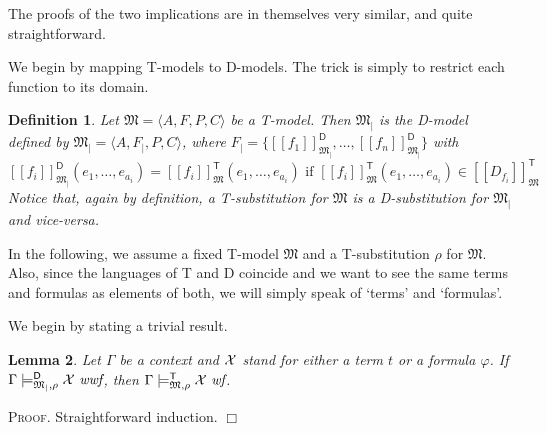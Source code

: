 \documentclass{article}
\newtheorem{definition}{Definition}[section]
\newtheorem{lemma}[definition]{Lemma}
\newenvironment{proof}{\smallskip\textsc{Proof.}}{\hspace*{\fill}$\Box$}
\newcommand{\D}{\textsf D}
\newcommand{\T}{\textsf T}
\newcommand{\restrfunm}[1]{\ensuremath{\mathfrak{#1}_|}}
\newcommand{\restrfun}[1]{\ensuremath{{#1}_|}}
\newcommand{\wf}{\ \mbox{\em wf}}
\newcommand{\wwf}{\ \mbox{\em wwf}}
\newcommand{\intm}[3]{\ensuremath{[\![{#3}]\!]^{\mathsf{#1}}_{\mathfrak{#2}}}}
\newcommand{\mymodelss}[3]{\ensuremath{\models_{\mathfrak{#2},{#3}}^{\mathsf{#1}}}}
\begin{document}
The proofs of the two implications are in themselves very similar, and
quite straightforward.

We begin by mapping {\T}-models to {\D}-models.  The trick is simply
to restrict each function to its domain.

\begin{definition}\label{defn:restrmap} Let
$\mathfrak M=\langle A,F,P,C\rangle$ be a {\T}-model.  Then $\restrfunm M$
is the {\D}-model defined by $\restrfunm M=\langle A,\restrfun F,P,C\rangle$,
where $\restrfun F=%
\{\intm{D}{\restrfunm M}{f_1},\ldots,\intm{D}{\restrfunm M}{f_n}\}$ with
\[\intm{D}{\restrfunm M}{f_i}(e_1,\ldots,e_{a_i})=%
\intm{T}M{f_i}(e_1,\ldots,e_{a_i})
 \mbox{ if $\intm{T}M{f_i}(e_1,\ldots,e_{a_i})\in\intm{T}M{D_{f_i}}$}\]
Notice that, again by definition, a {\T}-substitution for $\mathfrak M$ is a
{\D}-substitution for $\restrfunm M$ and vice-versa.
\end{definition}

In the following, we assume a fixed {\T}-model $\mathfrak M$ and a
{\T}-substitution $\rho$ for $\mathfrak M$.  Also, since the languages
of {\T} and {\D} coincide and we want to see the same terms and formulas
as elements of both, we will simply speak of `terms' and `formulas'.

We begin by stating a trivial result.
\begin{lemma}\label{DwwfTwf} Let $\Gamma$ be a context and ${\cal X}$
stand for either a term $t$ or a formula $\varphi$.
If $\Gamma\mymodelss{D}{\restrfunm M}\rho{\cal X}\wwf$,
then $\Gamma\mymodelss{T}M\rho{\cal X}\wf$.
\end{lemma}
\begin{proof}
Straightforward induction.
\end{proof}
\end{document}
